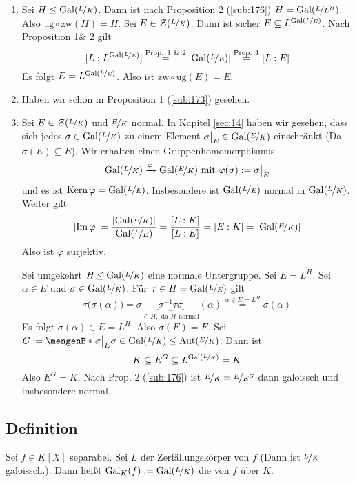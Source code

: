 \begin{enumerate}[(1)]
	\item Sei $H \le \operatorname{Gal}(\nicefrac{L}{K})$. Dann ist nach Proposition 2 (\ref{sub:176}) $H= \operatorname{Gal}(\nicefrac{L}{L^H})$. Also $\mathrm{ug} \circ \mathrm{zw}(H)=H$. Sei
	$E \in \mathcal{Z}(\nicefrac{L}{K})$. Dann ist sicher $E  \subseteq L^{\operatorname{Gal}(\nicefrac{L}{E})}$. Nach Proposition 1\& 2 gilt 
	\[
		[L:L^{\operatorname{Gal}(\nicefrac{L}{E})}] \stackrel{\text{Prop. 1 \& 2}}{=} \lvert\operatorname{Gal}(\nicefrac{L}{E})\rvert \stackrel{\text{Prop. 1}}{=} [L :E]
	\]
	Es folgt $E= L^{\operatorname{Gal}(\nicefrac{L}{E})}$. Also ist $\mathrm{zw} \circ \mathrm{ug}(E)=E$.
	\item Haben wir schon in Proposition 1 (\ref{sub:173}) gesehen.
	\item Sei $E \in \mathcal{Z}(\nicefrac{L}{K})$ und $\nicefrac{E}{K}$ normal. In Kapitel \ref{sec:14} haben wir gesehen, dass sich jedes $\sigma \in \operatorname{Gal}(\nicefrac{L}{K})$
	zu einem Element $\sigma\big|_E \in \operatorname{Gal}(\nicefrac{E}{K})$ einschränkt (Da $\sigma(E) \subseteq E$). Wir erhalten einen Gruppenhomomorphismus 
	\[
		\operatorname{Gal}(\nicefrac{L}{K}) \xrightarrow{\varphi} \operatorname{Gal}(\nicefrac{E}{K}) \text{ mit } \varphi(\sigma) := \sigma\big|_E 
	\]
	und es ist $\operatorname{Kern} \varphi = \operatorname{Gal}(\nicefrac{L}{E})$. Insbesondere ist $\operatorname{Gal}(\nicefrac{L}{E})$ normal in $\operatorname{Gal}(\nicefrac{L}{K})$. Weiter gilt
	\[
		\lvert\operatorname{Im} \varphi\rvert = \frac{\lvert\operatorname{Gal}(\nicefrac{L}{K})\rvert }{\lvert\operatorname{Gal}(\nicefrac{L}{E})\rvert }  = \frac{[L:K]}{[L:E]} = [E:K] = \lvert\operatorname{Gal}(\nicefrac{E}{K})\rvert 
	\]
	Also ist $\varphi$ surjektiv. 
	
	Sei umgekehrt $H \unlhd \operatorname{Gal}(\nicefrac{L}{K})$ eine normale Untergruppe. Sei $E=L^H$. Sei $\alpha \in E$ und $\sigma \in \operatorname{Gal}(\nicefrac{L}{K})$. Für 
	$\tau\in H= \operatorname{Gal}(\nicefrac{L}{E})$ gilt
	\[
		\tau\big(\sigma(\alpha)\big) = \sigma \underbrace{\sigma ^{-1} \tau \sigma}_{\in H, \text{ da } H \text{ normal}} (\alpha) \stackrel{\alpha \in E=L^H}{=} \sigma(\alpha)
	\]
	Es folgt $\sigma(\alpha) \in E=L^H$. Also $\sigma(E) =E$. Sei $G:= \set[\sigma\big|_E]{\sigma \in \Gal(\nicefrac{L}{K})} \le \Aut(\nicefrac{E}{K})$. Dann ist 
	\[
		K \subseteq E^G \subseteq L^{\operatorname{Gal}(\nicefrac{L}{K})} = K
	\]
	Also $E^G=K$. Nach Prop. 2 (\ref{sub:176}) ist $\nicefrac{E}{K} = \nicefrac{E}{E^G}$ dann galoissch und insbesondere normal. \bewende
\end{enumerate}

\subsection[Definition: Galois-Gruppe eines Polynoms]{Definition} %
\label{sub:179}
Sei $f \in K[X]$ separabel. Sei $L$ der Zerfällungskörper von $f$ (Dann ist $\nicefrac{L}{K}$ galoissch.). Dann heißt $\operatorname{Gal}_K(f) := \operatorname{Gal}(\nicefrac{L}{K})$ die
 von $f$ über $K$.

